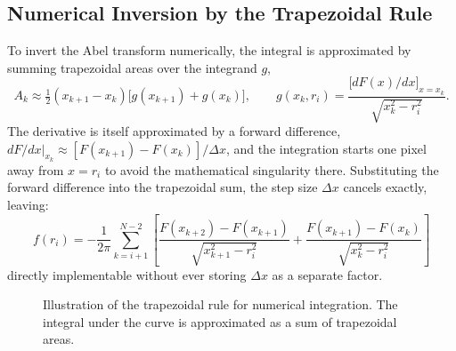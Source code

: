 \subsection{Numerical Inversion by the Trapezoidal Rule}
\label{subsec:abel_inversion}

To invert the Abel transform numerically, the integral is approximated by summing trapezoidal areas over the integrand $g$,
\begin{equation}
A_k \approx \tfrac12(x_{k+1}-x_k)\big[g(x_{k+1})+g(x_k)\big], \qquad g(x_k,r_i) = \frac{\big[dF(x)/dx\big]_{x=x_k}}{\sqrt{x_k^2-r_i^2}}.
\end{equation}
The derivative is itself approximated by a forward difference, $dF/dx|_{x_k} \approx [F(x_{k+1})-F(x_k)]/\Delta x$, and the integration starts one pixel away from $x=r_i$ to avoid the mathematical singularity there. Substituting the forward difference into the trapezoidal sum, the step size $\Delta x$ cancels exactly, leaving:
\begin{equation}
\boxed{f(r_i) = -\frac{1}{2\pi}\sum_{k=i+1}^{N-2} \left[ \frac{F(x_{k+2}) - F(x_{k+1})}{\sqrt{x_{k+1}^2 - r_i^2}} + \frac{F(x_{k+1}) - F(x_k)}{\sqrt{x_k^2 - r_i^2}} \right]}
\end{equation}
directly implementable without ever storing $\Delta x$ as a separate factor.

\begin{figure}[h!]
    \centering
    \caption{Illustration of the trapezoidal rule for numerical integration. The integral under the curve is approximated as a sum of trapezoidal areas.}
    \label{fig:trapezoidal}
\end{figure}

